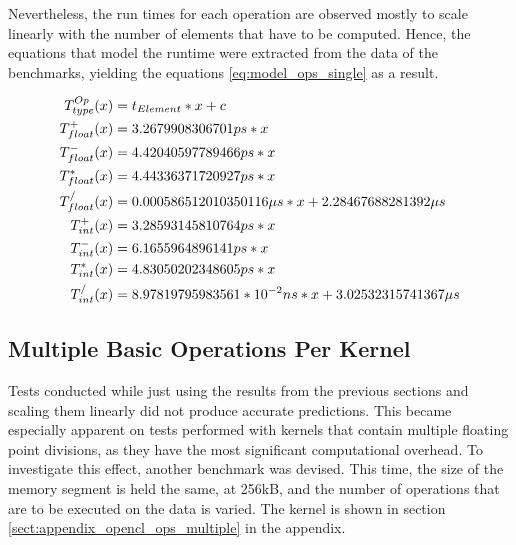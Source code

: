 Nevertheless, the run times for each operation are observed mostly to scale linearly with the number of elements that have to be computed. Hence, the equations that model the runtime were extracted from the data of the benchmarks, yielding the equations \ref{eq:model_ops_single} as a result.

\begin{align}
\label{eq:model_ops_single}
T^{Op}_{type}(x) &= t_{Element}*x+c\\
T^{+}_{float}(x) &= 3.2679908306701 ps*x\notag\\
T^{-}_{float}(x) &= 4.42040597789466 ps*x\notag\\
T^{*}_{float}(x) &= 4.44336371720927 ps*x\notag\\
T^{/}_{float}(x) &= 0.000586512010350116\mu s*x+2.28467688281392\mu s\notag\\
T^{+}_{int}(x) &= 3.28593145810764 ps*x\notag\\
T^{-}_{int}(x) &= 6.1655964896141 ps*x\notag\\
T^{*}_{int}(x) &= 4.83050202348605 ps*x\notag\\
T^{/}_{int}(x) &= 8.97819795983561 * 10^{-2}ns*x+3.02532315741367\mu s\notag
\end{align}

\subsection{Multiple Basic Operations Per Kernel}
\label{sect:model_ops_multiple}
Tests conducted while just using the results from the previous sections and scaling them linearly did not produce accurate predictions. This became especially apparent on tests performed with kernels that contain multiple floating point divisions, as they have the most significant computational overhead. To investigate this effect, another benchmark was devised. This time, the size of the memory segment is held the same, at 256kB, and the number of operations that are to be executed on the data is varied. The kernel is shown in section \ref{sect:appendix_opencl_ops_multiple} in the appendix. \\

